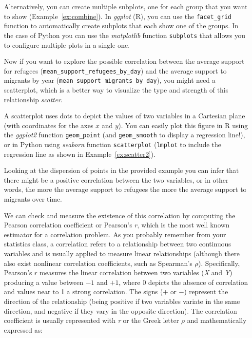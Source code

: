 Alternatively, you can create multiple subplots, one for each group that you want to show (Example~\ref{ex:combine}).
In \emph{ggplot} (R), you can use the \texttt{facet\_grid} function to automatically create subplots that each show one of the groups. In the case of Python you can use the \emph{matplotlib} function \texttt{subplots} that allows you to configure multiple plots in a single one.


Now if you want to explore the possible correlation between the average support for refugees (\texttt{mean\_support\_refugees\_by\_day}) and the average support to migrants by year (\texttt{mean\_support\_migrants\_by\_day}), you might need a scatterplot, which is a better way to visualize the type and strength of this relationship \emph{scatter}.


A scatterplot uses dots to depict the values of two variables in a Cartesian plane (with coordinates for the axes $x$ and $y$). You can easily plot this figure in R using the \emph{ggplot2} function \texttt{geom\_point} (and \texttt{geom\_smooth} to display a regression line!), or in Python using \emph{seaborn} function \texttt{scatterplot} (\texttt{lmplot} to include the regression line as shown in Example~\ref{ex:scatter2}).




Looking at the dispersion of points in the provided example you can infer that there might be a positive correlation between the two variables, or in other words, the more the average support to refugees the more the average support to migrants over time.

We can check and measure the existence of this correlation by computing the Pearson correlation coefficient or Pearson's \emph{r}, which is the most well known estimator for a correlation problem. As you probably remember from your statistics class, a correlation refers to a relationship between two continuous variables and is usually applied to measure linear relationships (although there  also exist nonlinear correlation coefficients, such as Spearman's $\rho$). Specifically, Pearson's $r$  measures the linear correlation between two variables (\emph{X} and \emph{Y}) producing a value between $-1$ and $+1$, where 0 depicts the absence of correlation and values near to 1 a strong correlation. The signs ($+$ or $-$) represent the direction of the relationship (being positive if two variables variate in the same direction, and negative if they vary in the opposite direction). The correlation coefficient is usually represented with \emph{r} or the Greek letter $\rho$ and mathematically expressed as:

